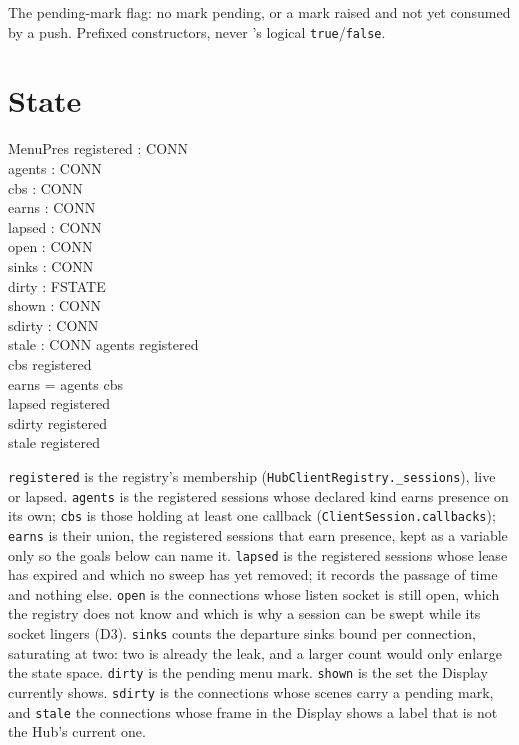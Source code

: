 \documentclass[a4paper,10pt,fleqn]{article}
\begin{document}
The pending-mark flag: no mark pending, or a mark raised and not yet
consumed by a push. Prefixed constructors, never \fuzz's logical
\texttt{true}/\texttt{false}.

\section{State}

\begin{schema}{MenuPres}
  registered : \power CONN \\
  agents : \power CONN \\
  cbs : \power CONN \\
  earns : \power CONN \\
  lapsed : \power CONN \\
  open : \power CONN \\
  sinks : CONN   \\
  dirty : FSTATE \\
  shown : \power CONN \\
  sdirty : \power CONN \\
  stale : \power CONN
\where
  agents \subseteq registered \\
  cbs \subseteq registered \\
  earns = agents \cup cbs \\
  lapsed \subseteq registered \\
  sdirty \subseteq registered \\
  stale \subseteq registered
\end{schema}

\texttt{registered} is the registry's membership
(\texttt{HubClientRegistry.\_sessions}), live or lapsed. \texttt{agents} is the
registered sessions whose declared kind earns presence on its own;
\texttt{cbs} is those holding at least one callback
(\texttt{ClientSession.callbacks}); \texttt{earns} is their union, the
registered sessions that earn presence, kept as a variable only so the goals
below can name it. \texttt{lapsed} is the registered sessions whose lease has
expired and which no sweep has yet removed; it records the passage of time and
nothing else. \texttt{open} is the connections whose listen socket is still
open, which the registry does not know and which is why a session can be swept
while its socket lingers (D3). \texttt{sinks} counts the departure sinks bound
per connection, saturating at two: two is already the leak, and a larger count
would only enlarge the state space. \texttt{dirty} is the pending menu mark.
\texttt{shown} is the set the Display currently shows. \texttt{sdirty} is the
connections whose scenes carry a pending mark, and \texttt{stale} the
connections whose frame in the Display shows a label that is not the Hub's
current one.
\end{document}
